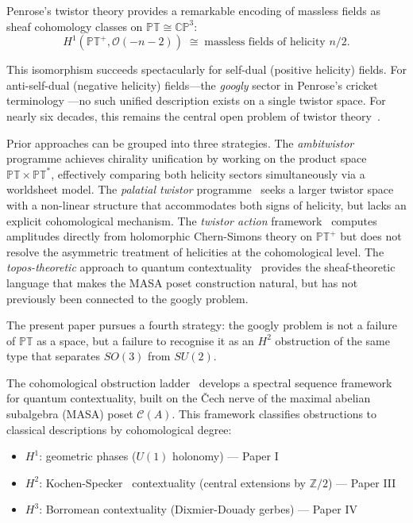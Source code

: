 \documentclass[11pt,a4paper]{article}
\theoremstyle{remark}
\newcommand{\PT}{\mathbb{PT}}
\newcommand{\CP}{\mathbb{CP}}
\newcommand{\Z}{\mathbb{Z}}
\newcommand{\cO}{\mathcal{O}}
\newcommand{\cC}{\mathcal{C}}
\begin{document}
Penrose's twistor theory \cite{Penrose1967} provides a remarkable
encoding of massless fields as sheaf cohomology classes on
$\PT \cong \CP^3$:
\[
  H^1(\PT^+, \cO(-n-2)) \;\cong\;
    \text{massless fields of helicity } n/2.
\]

This isomorphism succeeds spectacularly for self-dual
(positive helicity) fields. For anti-self-dual (negative helicity)
fields---the \emph{googly} sector in Penrose's cricket terminology
\cite{PenroseRindler}---no such unified description exists on a
single twistor space. For nearly six decades, this remains the central
open problem of twistor theory~\cite{Penrose2004}.

Prior approaches can be grouped into three strategies. The
\textit{ambitwistor} programme \newline \cite{MasonSkinner2014,CachazoHeYuan2014}
achieves chirality unification by working on the product space
$\PT \times \PT^*$, effectively comparing both helicity sectors
simultaneously via a worldsheet model. The \textit{palatial twistor}
programme~\cite{Penrose2004,Penrose2016} seeks a larger twistor space with a
non-linear structure that accommodates both signs of helicity,
but lacks an explicit cohomological mechanism. The \textit{twistor
action} framework~\cite{Adamo2017} computes amplitudes directly from
holomorphic Chern-Simons theory on $\PT^+$ but does not resolve the
asymmetric treatment of helicities at the cohomological level.
The \textit{topos-theoretic} approach to quantum
contextuality~\cite{IshamButterfield1999} provides the sheaf-theoretic
language that makes the MASA poset construction natural, but has not
previously been connected to the googly problem.

The present paper pursues a fourth strategy: the googly problem is
not a failure of $\PT$ as a space, but a failure to recognise it
as an $H^2$ obstruction of the same type that separates $SO(3)$ from
$SU(2)$.

The cohomological obstruction ladder~\cite{PaperI,PaperIII,PaperIV,PaperVI} develops a
spectral sequence framework for quantum contextuality, built on
the \v{C}ech nerve of the maximal abelian subalgebra (MASA) poset
$\cC(A)$. This framework classifies obstructions to classical
descriptions by cohomological degree:
\begin{itemize}
  \item $H^1$: geometric phases ($U(1)$ holonomy) --- Paper I~\cite{PaperI}
  \item $H^2$: Kochen-Specker~\cite{KochenSpecker} contextuality (central extensions by
    $\Z/2$) --- Paper III~\cite{PaperIII}
  \item $H^3$: Borromean contextuality (Dixmier-Douady gerbes) ---
    Paper IV~\cite{PaperIV}
\end{itemize}
\end{document}

